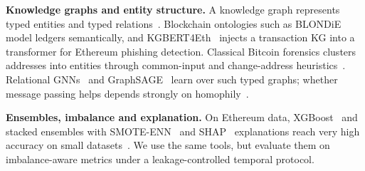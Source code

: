 \textbf{Knowledge graphs and entity structure.}
A knowledge graph represents typed entities and typed relations~\cite{hogan2021}.
Blockchain ontologies such as BLONDiE~\cite{ugarterojas2020} model ledgers
semantically, and KGBERT4Eth~\cite{jia2025kgbert4eth} injects a transaction KG
into a transformer for Ethereum phishing detection. Classical Bitcoin forensics
clusters addresses into entities through common-input and change-address
heuristics~\cite{meiklejohn2013}. Relational GNNs~\cite{schlichtkrull2018}
and GraphSAGE~\cite{hamilton2017} learn over such typed graphs; whether
message passing helps depends strongly on homophily~\cite{zhu2020,platonov2023}.

\textbf{Ensembles, imbalance and explanation.}
On Ethereum data, XGBoost~\cite{chen2016} and stacked ensembles with
SMOTE-ENN~\cite{chawla2002,batista2004} and SHAP~\cite{lundberg2017} explanations
reach very high accuracy on small datasets~\cite{taher2024,chithanuru2025}. We
use the same tools, but evaluate them on imbalance-aware metrics under a
leakage-controlled temporal protocol.
